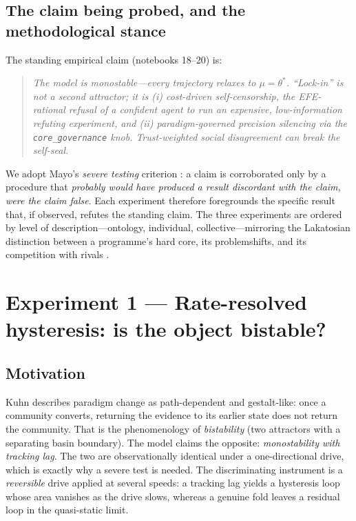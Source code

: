 \documentclass[11pt]{article}
\newcommand{\param}[1]{\texttt{#1}}
\newcommand{\thetastar}{\theta^{\!*}}
\begin{document}
\subsection{The claim being probed, and the methodological stance}

\noindent The standing empirical claim (notebooks 18--20) is:
\begin{quote}\itshape
The model is monostable---every trajectory relaxes to $\mu=\thetastar$. ``Lock-in''
is not a second attractor; it is (i) cost-driven \emph{self-censorship}, the
EFE-rational refusal of a confident agent to run an expensive, low-information
refuting experiment, and (ii) \emph{paradigm-governed precision silencing} via
the \param{core\_governance} knob. Trust-weighted social disagreement can break
the self-seal.
\end{quote}

We adopt Mayo's \emph{severe testing} criterion \cite{mayo2018severe}: a claim is
corroborated only by a procedure that \emph{probably would have produced a result
discordant with the claim, were the claim false}. Each experiment therefore
foregrounds the specific result that, if observed, refutes the standing claim.
The three experiments are ordered by level of description---ontology, individual,
collective---mirroring the Lakatosian distinction between a programme's hard core,
its problemshifts, and its competition with rivals \cite{lakatos1970methodology}.

\section{Experiment 1 --- Rate-resolved hysteresis: is the object bistable?}
\label{sec:exp1}

\subsection{Motivation}
Kuhn \cite{kuhn1962Structure} describes paradigm change as path-dependent and
gestalt-like: once a community converts, returning the evidence to its earlier
state does not return the community. That is the phenomenology of \emph{bistability}
(two attractors with a separating basin boundary). The model claims the opposite:
\emph{monostability with tracking lag}. The two are observationally identical under
a one-directional drive, which is exactly why a severe test is needed. The
discriminating instrument is a \emph{reversible} drive applied at several speeds:
a tracking lag yields a hysteresis loop whose area vanishes as the drive slows,
whereas a genuine fold leaves a residual loop in the quasi-static limit.
\end{document}
